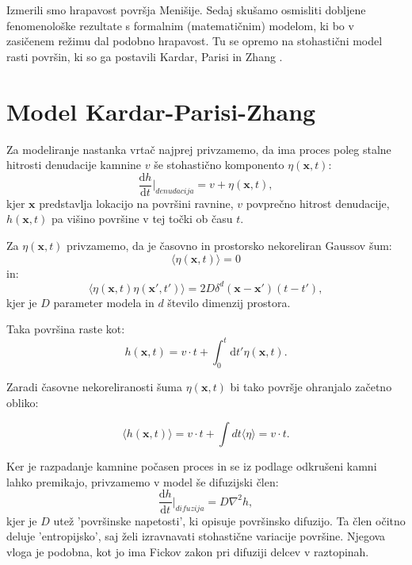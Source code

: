 \documentclass[a4paper, twoside, 12pt]{book}
\begin{document}
Izmerili smo hrapavost površja Menišije. Sedaj skušamo osmisliti dobljene fenomenološke rezultate s formalnim (matematičnim) modelom, ki bo v zasičenem režimu dal podobno hrapavost. Tu se opremo na stohastični model rasti površin, ki so ga postavili Kardar, Parisi in Zhang \cite{kardar1986dynamic}.

    \section{Model Kardar-Parisi-Zhang}

    Za modeliranje nastanka vrtač najprej privzamemo, da ima proces poleg stalne hitrosti denudacije kamnine $v$ še stohastično komponento $\eta(\mathbf{x},t)$:
\begin{equation}
  \frac{\mathrm{d} h}{\mathrm{d} t} \bigg|_{denudacija} = v + \eta(\mathbf{x},t),
\end{equation}
kjer $\mathbf{x}$ predstavlja lokacijo na površini ravnine, $v$ povprečno hitrost denudacije, $h(\mathbf{x},t)$ pa višino površine v tej točki ob času $t$. 

Za $\eta (\mathbf{x},t)$ privzamemo, da je časovno in prostorsko nekoreliran Gaussov šum: 
\begin{equation} 
  \langle \eta(\mathbf{x},t) \rangle=0
\end{equation}
in:
\begin{equation}
  \langle \eta(\mathbf{x},t) \eta(\mathbf{x'},t')\rangle = 2 D \delta^d(\mathbf{x}-\mathbf{x'})(t-t'),
\end{equation}
kjer je $D$ parameter modela in $d$ število dimenzij prostora.

Taka površina raste kot:
\begin{equation}
  h(\mathbf{x},t) = v \cdot t + \int_0^t \mathrm{d} t' \eta (\mathbf{x},t).
\end{equation}

Zaradi časovne nekoreliranosti šuma $\eta({\mathbf{x},t})$ bi tako površje ohranjalo začetno obliko:

\begin{equation}
  \langle h(\mathbf{x},t) \rangle = v \cdot t + \int dt \langle \eta \rangle = v \cdot t.
\end{equation}

Ker je razpadanje kamnine počasen proces in se iz podlage odkrušeni kamni lahko premikajo, privzamemo v model še difuzijski člen:
\begin{equation}
  \frac{\mathrm{d} h}{\mathrm{d} t} \bigg|_{difuzija} = D \nabla^2 h,
\end{equation}
kjer je $D$ utež 'površinske napetosti', ki opisuje površinsko difuzijo. Ta člen očitno deluje 'entropijsko',  saj želi izravnavati stohastične variacije površine. Njegova vloga je podobna, kot jo ima Fickov zakon pri difuziji delcev v raztopinah.
\end{document}
